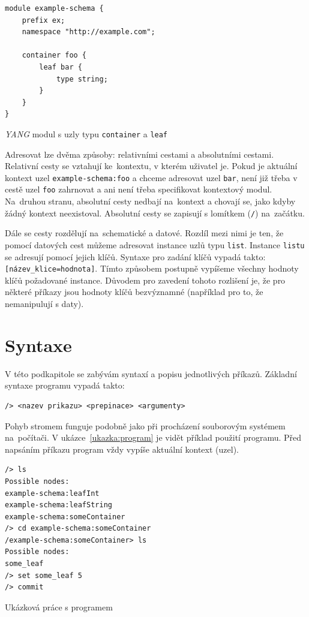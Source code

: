 \documentclass[thesis=B,czech,hidelinks]{FITthesis}[2019/03/06]
\begin{document}
\begin{listing}
\begin{verbatim}
module example-schema {
    prefix ex;
    namespace "http://example.com";

    container foo {
        leaf bar {
            type string;
        }
    }
}
\end{verbatim}
\caption{\textit{YANG} modul s uzly typu \texttt{container} a \texttt{leaf}}\label{yang:adresace}
\end{listing}

Adresovat lze dvěma způsoby: relativními cestami a absolutními cestami. Relativní cesty se vztahují ke~kontextu, v kterém uživatel je. Pokud je aktuální kontext uzel \texttt{example-schema:foo} a chceme adresovat uzel \texttt{bar}, není již třeba v cestě uzel \texttt{foo} zahrnovat a ani není třeba specifikovat kontextový modul. Na~druhou stranu, absolutní cesty nedbají na~kontext a chovají se, jako kdyby žádný kontext neexistoval. Absolutní cesty se zapisují s lomítkem (\texttt{/}) na~začátku.

Dále se cesty rozdělují na~schematické a datové. Rozdíl mezi nimi je ten, že pomocí datových cest můžeme adresovat instance uzlů typu \texttt{list}. Instance \texttt{listu} se adresují pomocí jejich klíčů. Syntaxe pro zadání klíčů vypadá takto: \verb¨[název_klice=hodnota]¨. Tímto způsobem postupně vypíšeme všechny hodnoty klíčů požadované instance. Důvodem pro zavedení tohoto rozlišení je, že pro některé příkazy jsou hodnoty klíčů bezvýznamné (například pro to, že nemanipulují s daty).

\section{Syntaxe}\label{syntaxe}
V této podkapitole se zabývám syntaxí a popisu jednotlivých příkazů. Základní syntaxe programu vypadá takto:
\begin{verbatim}
/> <nazev prikazu> <prepinace> <argumenty>
\end{verbatim}
Pohyb stromem funguje podobně jako při procházení souborovým systémem na~počítači. V ukázce~\ref{ukazka:program} je vidět příklad použití programu. Před napsáním příkazu program vždy vypíše aktuální kontext (uzel).
 
\begin{listing}[H]
\begin{verbatim}
/> ls
Possible nodes:
example-schema:leafInt
example-schema:leafString
example-schema:someContainer
/> cd example-schema:someContainer
/example-schema:someContainer> ls
Possible nodes:
some_leaf
/> set some_leaf 5
/> commit
\end{verbatim}
\caption{Ukázková práce s programem}\label{ukazka:program}
\end{listing}
\end{document}

